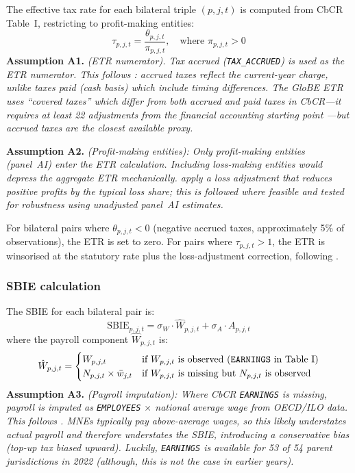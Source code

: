 \documentclass[11pt,a4paper]{article}
\newcommand{\code}[1]{\texttt{#1}}
\newcommand{\assumption}[2]{\noindent\textbf{Assumption #1.} \textit{#2}\medskip}
\begin{document}
The effective tax rate for each bilateral triple $(p, j, t)$ is computed from CbCR Table~I, restricting to profit-making entities:
\begin{equation}\label{eq:etr}
\tau_{p,j,t} = \frac{\theta_{p,j,t}}{\pi_{p,j,t}}, \quad \text{where } \pi_{p,j,t} > 0
\end{equation}
\assumption{A1}{(ETR numerator). Tax accrued (\code{TAX\_ACCRUED}) is used as the ETR numerator. This follows \citet{hugger2026}: accrued taxes reflect the current-year charge, unlike taxes paid (cash basis) which include timing differences. The GloBE ETR uses ``covered taxes'' which differ from both accrued and paid taxes in CbCR---it requires at least 22 adjustments from the financial accounting starting point \citep{hanlon2023}---but accrued taxes are the closest available proxy.}

\assumption{A2}{(Profit-making entities): Only profit-making entities (panel~AI) enter the ETR calculation. Including loss-making entities would depress the aggregate ETR mechanically. \citet{hugger2026} apply a loss adjustment that reduces positive profits by the typical loss share; this is followed where feasible and tested for robustness using unadjusted panel~AI estimates.}

For bilateral pairs where $\theta_{p,j,t} < 0$ (negative accrued taxes, approximately 5\% of observations), the ETR is set to zero. For pairs where $\tau_{p,j,t} > 1$, the ETR is winsorised at the statutory rate plus the loss-adjustment correction, following \citet{hugger2026}.

\subsubsection{SBIE calculation}\label{sec:sbie_calc}

The SBIE for each bilateral pair is:
\begin{equation}\label{eq:sbie}
\text{SBIE}_{p,j,t} = \sigma_W \cdot \hat{W}_{p,j,t} + \sigma_A \cdot A_{p,j,t}
\end{equation}
where the payroll component $\hat{W}_{p,j,t}$ is:
\begin{equation}\label{eq:payroll}
\hat{W}_{p,j,t} = \begin{cases}
W_{p,j,t} & \text{if } W_{p,j,t} \text{ is observed (\code{EARNINGS} in Table~I)} \\
N_{p,j,t} \times \bar{w}_{j,t} & \text{if } W_{p,j,t} \text{ is missing but } N_{p,j,t} \text{ is observed}
\end{cases}
\end{equation}
\assumption{A3}{(Payroll imputation): Where CbCR \code{EARNINGS} is missing, payroll is imputed as \code{EMPLOYEES} $\times$ national average wage from OECD/ILO data. This follows \citet{barake2022}. MNEs typically pay above-average wages, so this likely \emph{understates} actual payroll and therefore understates the SBIE, introducing a conservative bias (top-up tax biased upward). Luckily, \code{EARNINGS} is available for 53 of 54 parent jurisdictions in 2022 (although, this is not the case in earlier years).}
\end{document}
